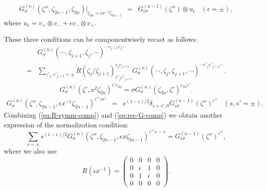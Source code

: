 \documentclass[a4paper,10pt]{article}
\begin{document}
\begin{equation}
\begin{array}{rcl}
G_{\sigma}^{(n)} 
(\zeta'',\zeta_{2n-1}, \zeta_{2n})|_{
\zeta_{2n}=\epsilon x^{-1}\zeta_{2n-1}} &=&
G_{\epsilon\sigma}^{(n-1)} (\zeta'')
\otimes u_\epsilon  ~~~~ (\epsilon =\pm ), 
\end{array}
\label{eq:rec-G}
\end{equation}
where $u_\epsilon =v_+ \otimes v_- +
\epsilon v_- \otimes v_+$. 

These three conditions can be componentwisely recast 
as follows: 
\begin{equation}
\begin{array}{cl}
&G_{\sigma}^{(n)} 
(\cdots,\zeta_{j+1},\zeta_j,\cdots)^{\cdots 
\varepsilon_{j+1}\varepsilon_j \cdots} \\
=&\displaystyle\sum_{
\varepsilon'_j, \varepsilon'_{j+1}=\pm} 
R(\zeta_j/\zeta_{j+1})^{\varepsilon_j 
\varepsilon_{j+1}}_{\varepsilon'_j \varepsilon'_{j+1}}
G_{\sigma}^{(n)} 
(\cdots,\zeta_j,\zeta_{j+1},\cdots)^{\cdots 
\varepsilon'_{j}\varepsilon'_{j+1} \cdots}. 
\end{array}
\label{eq:R-symm-comp} 
\end{equation}
\begin{equation}
G_{\sigma}^{(n)} 
(\zeta', x^{2}\zeta_{2n})^{\varepsilon' \varepsilon_{2n}}
=\sigma G_{\sigma}^{(n)} 
(\zeta_{2n}, \zeta')^{\varepsilon_{2n}\varepsilon'}. 
\label{eq:cyc-comp}
\end{equation}
\begin{equation}
\begin{array}{rcl}
G_{\sigma}^{(n)} 
(\zeta'',\zeta_{2n-1}, \epsilon x^{-1}\zeta_{2n-1})^{
\varepsilon''\, ss'} &=&s^{(1-\epsilon )/2}
\delta_{s+s',0}
G_{\epsilon\sigma}^{(n-1)} (\zeta'')^{\varepsilon''} 
~~~~ (s,s'=\pm ). 
\end{array}
\label{eq:rec-G-comp}
\end{equation}
Combining (\ref{eq:R-symm-comp}) and (\ref{eq:rec-G-comp}) 
we obtain another expression of the normalization 
condition: 
$$
\displaystyle\sum_{s=\pm}
s^{(1-\epsilon )/2} G_{\sigma}^{(n)} 
(\zeta'',\zeta_{2n-1}, \epsilon x\zeta_{2n-1})^{
\varepsilon''\, s\, -s}=
G_{\epsilon\sigma}^{(n-1)} (\zeta'')^{\varepsilon''}, 
$$
where we also use 
$$
R(\epsilon x^{-1})=\left( \begin{array}{cccc} 
0 & 0 & 0 & 0 \\
0 & \epsilon & 1 & 0 \\ 0 & 1 & \epsilon & 0 \\ 
0 & 0 & 0 & 0 \end{array} \right). 
$$
\end{document}
